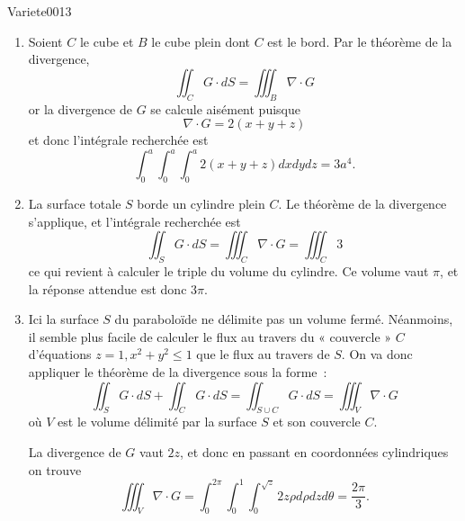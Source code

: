 
\begin{corrige}{Variete0013}



\begin{enumerate}
\item Soient $C$ le cube et $B$ le cube plein dont $C$ est le bord. Par
  le théorème de la divergence,
  \begin{equation*}
    \iint_C G\cdot d S = \iiint_B \nabla\cdot G
  \end{equation*}
  or la divergence de $G$ se calcule aisément puisque
  \begin{equation*}
    \nabla\cdot G = 2(x+y+z)
  \end{equation*}
  et donc l'intégrale recherchée est
  \begin{equation*}
    \int_0^a \int_0^a \int_0^a 2 (x+y+z) d xd y d z= 3 a^4.
  \end{equation*}
\item La surface totale $S$ borde un cylindre plein $C$. Le théorème
  de la divergence s'applique, et l'intégrale recherchée est
  \begin{equation*}
    \iint_S G \cdot d S = \iiint_C \nabla\cdot G = \iiint_C 3
  \end{equation*}
  ce qui revient à calculer le triple du volume du cylindre. Ce volume vaut
  $\pi$, et la réponse attendue est donc $3\pi$.

\item Ici la surface $S$ du paraboloïde ne délimite pas un volume
  fermé. Néanmoins, il semble plus facile de calculer le flux au
  travers du « couvercle » $C$ d'équations $z = 1, x^2 + y^2 \leq 1$ que le flux au
  travers de $S$. On va donc appliquer le théorème de la divergence
  sous la forme~:
  \begin{equation*}
    \iint_S G \cdot d S + \iint_C G \cdot d S = \iint_{S \cup C} G \cdot d S =
    \iiint_V \nabla\cdot G
  \end{equation*}
  où $V$ est le volume délimité par la surface $S$ et son couvercle
  $C$.

  La divergence de $G$ vaut $2 z$, et donc en passant en coordonnées
  cylindriques on trouve
  \begin{equation*}
    \iiint_V \nabla\cdot G = \int_0^{2\pi}\int_0^1 \int_0^{\sqrt z} 2 z \rho d \rho
    d z d \theta = \frac{2 \pi}{3}.
  \end{equation*}


\end{enumerate}
\end{corrige}
